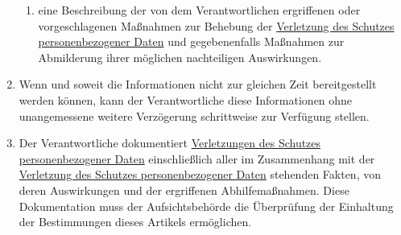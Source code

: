\begin{enumerate}
\begin{enumerate}
    \item eine Beschreibung der von dem Verantwortlichen ergriffenen oder vorgeschlagenen Maßnahmen zur Behebung der
     \hyperref[itm:04-12]{Verletzung des Schutzes personenbezogener Daten} und gegebenenfalls Maßnahmen zur Abmilderung ihrer möglichen
     nachteiligen Auswirkungen.
    \label{itm:33-3d}

  \end{enumerate}

  \item Wenn und soweit die Informationen nicht zur gleichen Zeit bereitgestellt werden können, kann der Verantwortliche
   diese Informationen ohne unangemessene weitere Verzögerung schrittweise zur Verfügung stellen.
  \label{itm:33-4}

  \item Der Verantwortliche dokumentiert \hyperref[itm:04-12]{Verletzungen des Schutzes personenbezogener Daten} einschließlich aller im
   Zusammenhang mit der \hyperref[itm:04-12]{Verletzung des Schutzes personenbezogener Daten} stehenden Fakten, von deren Auswirkungen und
   der ergriffenen Abhilfemaßnahmen. Diese Dokumentation muss der Aufsichtsbehörde die Überprüfung der Einhaltung der
   Bestimmungen dieses Artikels ermöglichen.
  \label{itm:33-5}

\end{enumerate}


